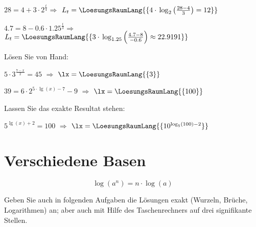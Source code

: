 \begin{bbwAufgabenBlock}
\noTRAINER{\seitenUmbruchImAufgabenteil{}}

\item $28 = 4 + 3\cdot{} 2^\frac{t}{4} \Longrightarrow$ $L_t
= \LoesungsRaumLang{\{ 4\cdot{} \log_2\left(\frac{28-4}3\right) = 12 \}}$ 


\item $4.7 = 8 - 0.6\cdot{} 1.25^{\frac{t}{3}} \Longrightarrow$ $L_t
= \LoesungsRaumLang{\{
3\cdot{} \log_{1.25}\left(\frac{4.7-8}{-0.6}\right) \approx 22.9191  \}}$ 

\noTRAINER{\seitenUmbruchImAufgabenteil{}}


Lösen Sie von Hand:

\item $5 \cdot{} 3^{\frac{7-x}{2}} = 45$  $\Longrightarrow$ $\lx=\LoesungsRaumLang{\{  3   \}}$ 

\item $39 =  6\cdot{} 2 ^{5\cdot{} \lg(x) - 7} - 9$  $\Longrightarrow$ $\lx = \LoesungsRaumLang{\{ 100 \}}$ 
\noTRAINER{\seitenUmbruchImAufgabenteil{}}

Lassen Sie das exakte Resultat stehen:

\item $5^{\lg(x)+2} = 100$  $\Longrightarrow$ $\lx=\LoesungsRaumLang{\{  10^{\log_5(100)-2}   \}}$ 



\end{bbwAufgabenBlock}

\platzFuerBerechnungenBisEndeSeite{}
\newpage

\section{Verschiedene Basen}

$$\log(a^n) = n\cdot{}\log(a)$$

Geben Sie auch in folgenden Aufgaben die Lösungen exakt (Wurzeln,
Brüche, Logarithmen) an; aber auch mit Hilfe des Taschenrechners auf drei
signifikante Stellen.

